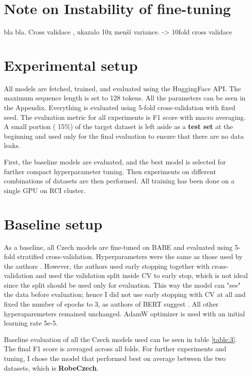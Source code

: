 \section{Note on Instability of fine-tuning}
bla bla. Cross validace , ukazalo 10x menší variance. -> 10fold cross validace



\section{Experimental setup}
All models are fetched, trained, and evaluated using the HuggingFace API. The maximum sequence length is set to 128 tokens. All the parameters can be seen in the Appendix.
Everything is evaluated using 5-fold cross-validation with fixed seed. The evaluation metric for all experiments is F1 score with macro averaging. A small portion ( 15\%) of the target dataset is left aside as a \textbf{test set} at the beginning and used only for the final evaluation to ensure that there are no data leaks.

First, the baseline models are evaluated, and the best model is selected for further compact hyperparameter tuning. Then experiments on different combinations of datasets are then performed.
All training has been done on a single GPU on RCI cluster.





 \section{Baseline setup}
 As a baseline, all Czech models are fine-tuned on BABE and evaluated using 5-fold stratified cross-validation. Hyperparameters were the same as those used by the authors \cite{Spinde2021MBIC}. However, the authors used early stopping together with cross-validation and used the validation split inside CV to early stop, which is not ideal since the split should be used only for evaluation. This way the model can "see" the data before evaluation; hence I did not use early stopping with CV at all and fixed the number of epochs to 3, as authors of BERT suggest \cite{devlin2019bert} . 
 All other hyperaparemeters remained unchanged. AdamW optimizer is used with an initial learning rate 5e-5. 
 
 Baseline evaluation of all the Czech models used can be seen in table \ref{table:3}. The final F1 score is averaged across all folds. For further experiments and tuning, I chose the model that performed best on average between the two datasets, which is \textbf{RobeCzech}.
 

